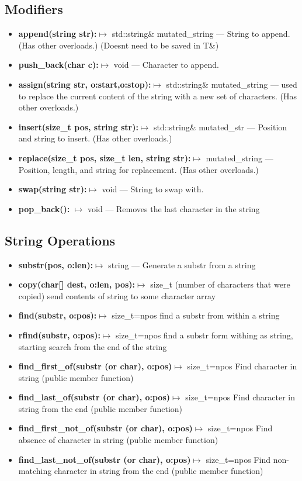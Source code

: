 \documentclass{report}
\begin{document}
    \subsection{Modifiers}
    \begin{itemize}
        \item \textbf{append(string str):}$\mapsto$ std::string\& mutated\_string --- String to append. (Has other overloads.) (Doesnt need to be saved in T\&)
        \item \textbf{push\_back(char c):}$\mapsto$ void --- Character to append.
        \item \textbf{assign(string str, o:start,o:stop):}$\mapsto$ std::string\& mutated\_string  --- used to replace the current content of the string with a new set of characters. (Has other overloads.)
        \item \textbf{insert(size\_t pos, string str):}$\mapsto$ std::string\& mutated\_str --- Position and string to insert. (Has other overloads.)
        \item \textbf{replace(size\_t pos, size\_t len, string str):}$\mapsto $ mutated\_string --- Position, length, and string for replacement. (Has other overloads.)
        \item \textbf{swap(string str):}$\mapsto$ void --- String to swap with.
        \item \textbf{pop\_back():} $\mapsto$ void --- Removes the last character in the string
    \end{itemize}

    \pagebreak \bigbreak \noindent 
    \subsection{String Operations}
    \begin{itemize}
        \item \textbf{substr(pos, o:len):}$\mapsto$ string --- Generate a substr from a string 
        \item \textbf{copy(char[] dest, o:len, pos):}$\mapsto$ size\_t (number of characters that were copied) send contents of string to some character array
        \item \textbf{find(substr, o:pos):}$\mapsto$ size\_t=npos find a substr from within a string
        \item \textbf{rfind(substr, o:pos):}$\mapsto$ size\_t=npos  find a substr form withing as string, starting search from the end of the string
        \item \textbf{find\_first\_of(substr (or char), o:pos)}$\mapsto$ size\_t=npos Find character in string (public member function)
        \item \textbf{find\_last\_of(substr (or char), o:pos)}$\mapsto$ size\_t=npos	Find character in string from the end (public member function)
        \item \textbf{find\_first\_not\_of(substr (or char), o:pos)}$\mapsto$ size\_t=npos	Find absence of character in string (public member function)
        \item \textbf{find\_last\_not\_of(substr (or char), o:pos)}$\mapsto$ size\_t=npos	Find non-matching character in string from the end (public member function)
    \end{itemize}
    \bigbreak \noindent 
\end{document}
